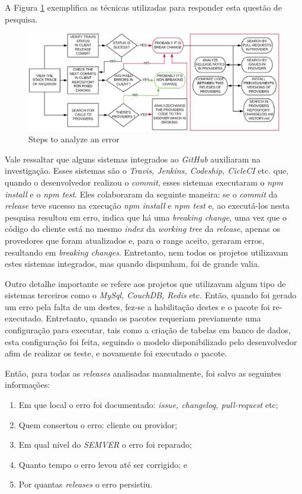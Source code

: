 A Figura \ref{fig:step_analyze} exemplifica as técnicas utilizadas para responder esta questão de pesquisa.

\begin{figure}
    \centering
    \includegraphics[scale=0.35]{figuras/step_analyze.jpeg}
    \caption{Steps to analyze an error}
    \label{fig:step_analyze}
\end{figure}

Vale ressaltar que alguns sistemas integrados ao \textit{GitHub} auxiliaram na investigação. Esses sistemas são o \textit{Travis, Jenkins, Codeship, CicleCI} etc. que, quando o desenvolvedor realizou o \textit{commit}, esses sistemas executaram o \textit{npm install} e o \textit{npm test}. Eles colaboraram da seguinte maneira: se o \textit{commit} da \textit{release} teve sucesso na execução \textit{npm install} e \textit{npm test} e, ao executá-los nesta pesquisa resultou em erro, indica que há uma \textit{breaking change}, uma vez que o código do cliente está no mesmo \textit{index} da \textit{working tree} da \textit{release}, apenas os provedores que foram atualizados e, para o range aceito, geraram erros, resultando em \textit{breaking changes}. Entretanto, nem todos os projetos utilizavam estes sistemas integrados, mas quando dispunham, foi de grande valia.

Outro detalhe importante se refere aos projetos que utilizavam algum tipo de sistemas terceiros como o \textit{MySql, CouchDB, Redis} etc. Então, quando foi gerado um erro pela falta de um destes, fez-se a habilitação destes e o pacote foi re-executado. Entretanto, quando os pacotes requeriam previamente uma configuração para executar, tais como a criação de tabelas em banco de dados, esta configuração foi feita, seguindo o modelo disponibilizado pelo desenvolvedor afim de realizar os teste, e novamente foi executado o pacote.

Então, para todas as \textit{releases} analisadas manualmente, foi salvo as seguintes informações:

\begin{enumerate}
    \item Em que local o erro foi documentado: \textit{issue, changelog, pull-request} etc;
    \item Quem consertou o erro: cliente ou providor;
    \item Em qual nível do \textit{SEMVER} o erro foi reparado;
    \item Quanto tempo o erro levou até ser corrigido; e
    \item Por quantas \textit{releases} o erro persistiu.
\end{enumerate}{}

